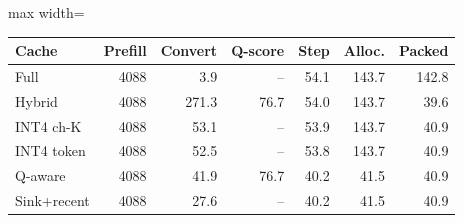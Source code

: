 \scriptsize
\setlength{\tabcolsep}{3.5pt}
\label{tab:t2csys4096}
\begin{adjustbox}{max width=\linewidth}
\begin{tabular}{lrrrrrr}
\toprule
Cache & Prefill & Convert & Q-score & Step & Alloc. & Packed \\
\midrule
Full & 4088 & 3.9 & -- & 54.1 & 143.7 & 142.8 \\
Hybrid & 4088 & 271.3 & 76.7 & 54.0 & 143.7 & 39.6 \\
INT4 ch-K & 4088 & 53.1 & -- & 53.9 & 143.7 & 40.9 \\
INT4 token & 4088 & 52.5 & -- & 53.8 & 143.7 & 40.9 \\
Q-aware & 4088 & 41.9 & 76.7 & 40.2 & 41.5 & 40.9 \\
Sink+recent & 4088 & 27.6 & -- & 40.2 & 41.5 & 40.9 \\
\bottomrule
\end{tabular}
\end{adjustbox}
